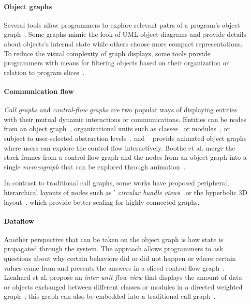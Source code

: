 \paragraph{Object graphs}

Several tools allow programmers to explore relevant patrs of a program's object graph~\cite{moreno2004visualizing,gestwicki2005methodology}.
Some graphs mimic the look of UML object diagrams and provide details about objects's internal state while others choose more compact representations.
To reduce the visual complexity of graph displays, some tools provide programmers with means for filtering objects based on their organization or relation to program slices~\cite{lange1997object,hamouLhadj2004survey}.

\paragraph{Communication flow}

\emph{Call graphs} and \emph{control-flow graphs} are two popular ways of displaying entities with their mutual dynamic interactions or communications.
Entities can be nodes from an object graph~\cite{tramnitzke2007object}, organizational units such as classes~\cite{reiss2007visual} or modules~\cite{prestin2022hidden}, or subject to user-selected abstraction levels~\cite{lange1997object,dePauw1998execution,walker1998visualizing}.
 and ~\cite{schweizer2014pathobjects} provide animated object graphs where users can explore the control flow interactively.
Boothe et al. merge the stack frames from a control-flow graph and the nodes from an object graph into a single \emph{memeograph} that can be explored through animation~\cite{boothe2011animation}.

In contrast to traditional call graphs, some works have proposed peripheral, hierarchical layouts of nodes such as ' \emph{circular bundle views}~\cite{cornelissen2009trace} or the  hyperbolic 3D layout~\cite{munzner1997h3}, which provide better scaling for highly connected graphs.

\paragraph{Dataflow}

Another perspective that can be taken on the object graph is how state is propagated through the system.
The  approach allows programmers to ask questions about why certain behaviors did or did not happen or where certain values came from and presents the answers in a sliced control-flow graph~\cite{ko2008debugging}.
Lienhard et al. propose an \emph{inter-unit flow view} that displays the amount of data or objects exchanged between different classes or modules in a directed weighted graph~\cite{lienhard2009taking}; this graph can also be embedded into a traditional call graph~\cite{lienhard2009flow}.

